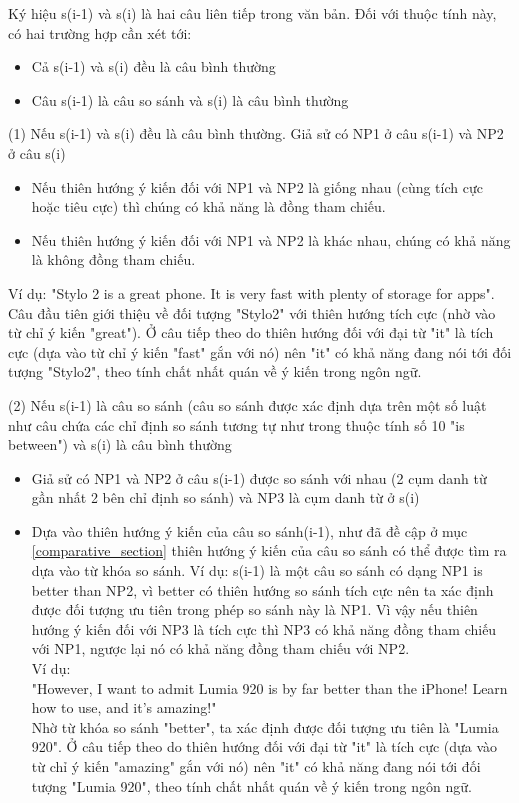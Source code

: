 \documentclass[12pt]{report}
\begin{document}
					\par Ký hiệu s(i-1) và s(i) là hai câu liên tiếp trong văn bản. Đối với thuộc tính này, có hai trường hợp cần xét tới:
						\begin{itemize}
							\item{Cả s(i-1) và s(i) đều là câu bình thường}
							\item{Câu s(i-1) là câu so sánh và s(i) là câu bình thường}
						\end{itemize}
					\par (1) Nếu s(i-1) và s(i) đều là câu bình thường. Giả sử có NP1 ở câu s(i-1) và NP2 ở câu s(i)
					\begin{itemize}
						\item{Nếu thiên hướng ý kiến đối với NP1 và NP2 là giống nhau (cùng tích cực hoặc tiêu cực) thì chúng có khả năng là đồng tham chiếu.}
						\item{Nếu thiên hướng ý kiến đối với NP1 và NP2 là khác nhau, chúng có khả năng là không đồng tham chiếu.}
					\end{itemize}
					\par Ví dụ: "Stylo 2 is a great phone. It is very fast with plenty of storage for apps".
						\\Câu đầu tiên giới thiệu về đối tượng "Stylo2" với thiên hướng tích cực (nhờ vào từ chỉ ý kiến "great"). Ở câu tiếp theo do thiên hướng đối với đại từ "it" là tích cực (dựa vào từ chỉ ý kiến "fast" gắn với nó) nên "it" có khả năng đang nói tới đối tượng "Stylo2", theo tính chất nhất quán về ý kiến trong ngôn ngữ.
					\par (2) Nếu s(i-1) là câu so sánh (câu so sánh được xác định dựa trên một số luật như câu chứa các chỉ định so sánh tương tự như trong thuộc tính số 10 "is between") và s(i) là câu bình thường
					\begin{itemize}
						\item{Giả sử có NP1 và NP2 ở câu s(i-1) được so sánh với nhau (2 cụm danh từ gần nhất 2 bên chỉ định so sánh) và NP3 là cụm danh từ ở s(i)}
						\item{Dựa vào thiên hướng ý kiến của câu so sánh(i-1), như đã đề cập ở mục \ref{comparative_section} thiên hướng ý kiến của câu so sánh có thể được tìm ra dựa vào từ khóa so sánh. Ví dụ: s(i-1) là một câu so sánh có dạng NP1 is better than NP2, vì better có thiên hướng so sánh tích cực nên ta xác định được đối tượng ưu tiên trong phép so sánh này là NP1. Vì vậy nếu thiên hướng ý kiến đối với NP3 là tích cực thì NP3 có khả năng đồng tham chiếu với NP1, ngược lại nó có khả năng đồng tham chiếu với NP2.
						\\ Ví dụ:
						\\"However, I want to admit Lumia 920 is by far better than the iPhone! Learn how to use, and it's amazing!" 
						\\Nhờ từ khóa so sánh "better", ta xác định được đối tượng ưu tiên là "Lumia 920". Ở câu tiếp theo do thiên hướng đối với đại từ "it" là tích cực (dựa vào từ chỉ ý kiến "amazing" gắn với nó) nên "it" có khả năng đang nói tới đối tượng "Lumia 920", theo tính chất nhất quán về ý kiến trong ngôn ngữ.}
					\end{itemize}
\end{document}
